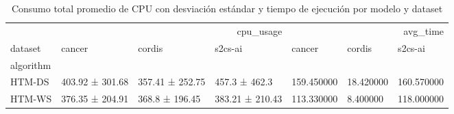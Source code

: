 \begin{table}
\caption{Consumo total promedio de CPU con desviación estándar y tiempo de ejecución por modelo y dataset}
\label{tab:cpu_usage_with_std}
\begin{tabular}{lllllll}
\toprule
 & \multicolumn{3}{r}{cpu_usage} & \multicolumn{3}{r}{avg_time} \\
dataset & cancer & cordis & s2cs-ai & cancer & cordis & s2cs-ai \\
algorithm &  &  &  &  &  &  \\
\midrule\n\cmidrule(lr){2-4} %
HTM-DS & 403.92 ± 301.68 & 357.41 ± 252.75 & 457.3 ± 462.3 & 159.450000 & 18.420000 & 160.570000 \\
HTM-WS & 376.35 ± 204.91 & 368.8 ± 196.45 & 383.21 ± 210.43 & 113.330000 & 8.400000 & 118.000000 \\
\cmidrule(lr){2-4} %
\end{tabular}
\end{table}
